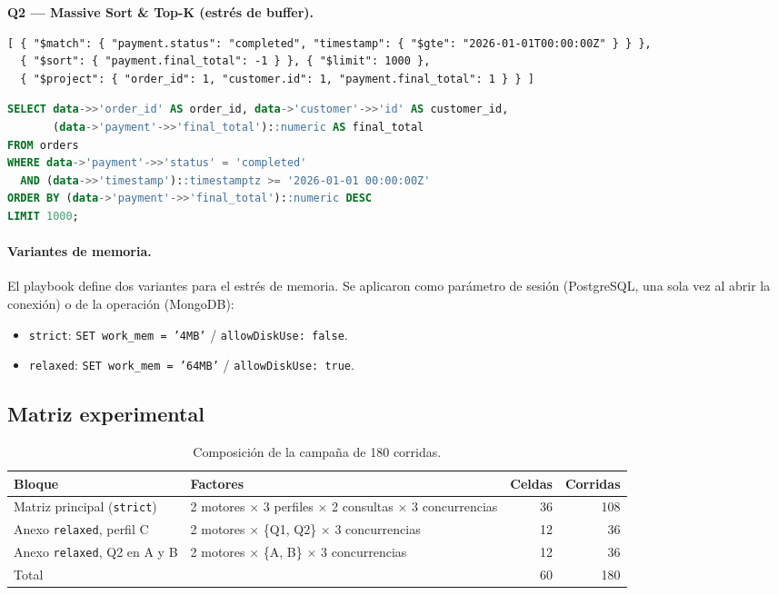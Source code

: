 \documentclass[11pt,a4paper]{article}
\begin{document}
\medskip\noindent\textbf{Q2 --- Massive Sort \& Top-K (estrés de buffer).}\par
\begin{lstlisting}
[ { "$match": { "payment.status": "completed", "timestamp": { "$gte": "2026-01-01T00:00:00Z" } } },
  { "$sort": { "payment.final_total": -1 } }, { "$limit": 1000 },
  { "$project": { "order_id": 1, "customer.id": 1, "payment.final_total": 1 } } ]
\end{lstlisting}
\begin{lstlisting}[language=SQL]
SELECT data->>'order_id' AS order_id, data->'customer'->>'id' AS customer_id,
       (data->'payment'->>'final_total')::numeric AS final_total
FROM orders
WHERE data->'payment'->>'status' = 'completed'
  AND (data->>'timestamp')::timestamptz >= '2026-01-01 00:00:00Z'
ORDER BY (data->'payment'->>'final_total')::numeric DESC
LIMIT 1000;
\end{lstlisting}

\paragraph{Variantes de memoria.} El playbook define dos variantes para el estrés de memoria. Se aplicaron como parámetro de sesión (PostgreSQL, una sola vez al abrir la conexión) o de la operación (MongoDB):
\begin{itemize}
  \item \texttt{strict}: \texttt{SET work\_mem = '4MB'} / \texttt{allowDiskUse: false}.
  \item \texttt{relaxed}: \texttt{SET work\_mem = '64MB'} / \texttt{allowDiskUse: true}.
\end{itemize}

\subsection{Matriz experimental}

\begin{table}[H]
\centering\small
\caption{Composición de la campaña de 180 corridas.}\label{tab:matriz}
\begin{tabular}{p{4.6cm}p{6.6cm}rr}
\toprule
Bloque & Factores & Celdas & Corridas \\
\midrule
Matriz principal (\texttt{strict}) & 2 motores $\times$ 3 perfiles $\times$ 2 consultas $\times$ 3 concurrencias & 36 & 108 \\
Anexo \texttt{relaxed}, perfil C & 2 motores $\times$ \{Q1, Q2\} $\times$ 3 concurrencias & 12 & 36 \\
Anexo \texttt{relaxed}, Q2 en A y B & 2 motores $\times$ \{A, B\} $\times$ 3 concurrencias & 12 & 36 \\
\midrule
Total & & 60 & 180 \\
\bottomrule
\end{tabular}
\end{table}
\end{document}

